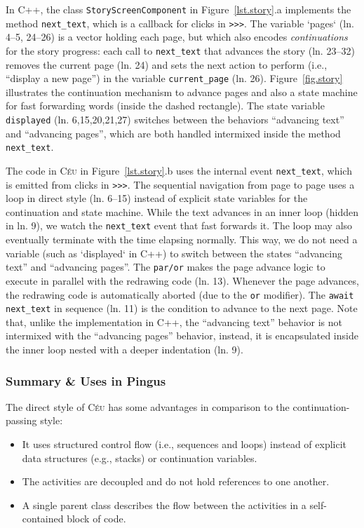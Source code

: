 \documentclass{vgtc}                          %
\newcommand{\CEU}{\textsc{C\'{e}u}\xspace}
\newcommand{\code}[1] {{\small{\texttt{#1}}}}
\begin{document}
In C++, the class \code{StoryScreenComponent} in Figure~\ref{lst.story}.a
implements the method \code{next\_text}, which is a callback for clicks in
\code{>>>}.
%
The variable `pages` (ln. 4--5, 24--26) is a vector holding each page, but
which also encodes \emph{continuations} for the story progress:
each call to \code{next\_text} that advances the story (ln. 23--32) removes the 
current page (ln. 24) and sets the next action to perform (i.e., ``display a
new page'') in the variable \code{current\_page} (ln. 26).
Figure~\ref{fig.story} illustrates the continuation mechanism to advance 
pages and also a state machine for fast forwarding words (inside the dashed
rectangle).
The state variable \code{displayed} (ln. 6,15,20,21,27) switches between the
behaviors ``advancing text'' and ``advancing pages'', which are both handled
intermixed inside the method \code{next\_text}.

The code in \CEU in Figure~\ref{lst.story}.b uses the internal event
\code{next\_text}, which is emitted from clicks in \code{>>>}.
%
The sequential navigation from page to page uses a loop in direct style
(ln. 6--15) instead of explicit state variables for the continuation and state
machine.
While the text advances in an inner loop (hidden in ln. 9), we watch the
\code{next\_text} event that fast forwards it.
The loop may also eventually terminate with the time elapsing normally.
This way, we do not need a variable (such as `displayed` in C++) to switch 
between the states ``advancing text'' and ``advancing pages''.
The \code{par/or} makes the page advance logic to execute in parallel with the
redrawing code (ln. 13).
Whenever the page advances, the redrawing code is automatically aborted
(due to the \code{or} modifier).
The \code{await next\_text} in sequence (ln. 11) is the condition to advance to
the next page.
%
Note that, unlike the implementation in C++, the ``advancing text'' behavior is
not intermixed with the ``advancing pages'' behavior, instead, it is
encapsulated inside the inner loop nested with a deeper indentation (ln. 9).

\subsubsection{Summary \& Uses in Pingus}

The direct style of \CEU has some advantages in comparison to the 
continuation-passing style:
%
\begin{itemize}
\item It uses structured control flow (i.e., sequences and loops) instead of 
      explicit data structures (e.g., stacks) or continuation variables.
\item The activities are decoupled and do not hold references to one another.
\item A single parent class describes the flow between the activities in a 
      self-contained block of code.
\end{itemize}
\end{document}
